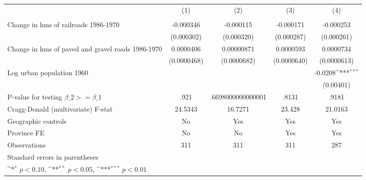 {
\def\sym#1{\ifmmode^{#1}\else\(^{#1}\)\fi}
\begin{tabular}{l*{4}{c}}
\hline\hline
                &\multicolumn{1}{c}{(1)}&\multicolumn{1}{c}{(2)}&\multicolumn{1}{c}{(3)}&\multicolumn{1}{c}{(4)}\\
                &\multicolumn{1}{c}{}&\multicolumn{1}{c}{}&\multicolumn{1}{c}{}&\multicolumn{1}{c}{}\\
\hline
Change in kms of railroads 1986-1970&-0.000346         &-0.000115         &-0.000171         &-0.000253         \\
                &(0.000302)         &(0.000320)         &(0.000287)         &(0.000261)         \\
[1em]
Change in kms of paved and gravel roads 1986-1970&0.0000406         &0.00000871         &0.0000593         &0.0000734         \\
                &(0.0000468)         &(0.0000682)         &(0.0000640)         &(0.0000613)         \\
[1em]
Log urban population 1960&                  &                  &                  &  -0.0208\sym{***}\\
                &                  &                  &                  &(0.00401)         \\
\hline
P-value for testing $\beta\_{2} >= \beta\_{1}$&     .921         &.6698000000000001         &    .8131         &    .9181         \\
Cragg-Donald (multivariate) F-stat&  24.5343         &  16.7271         &   23.428         &  21.0163         \\
Geographic controls&       No         &      Yes         &      Yes         &      Yes         \\
Province FE     &       No         &       No         &      Yes         &      Yes         \\
Observations    &      311         &      311         &      311         &      287         \\
\hline\hline
\multicolumn{5}{l}{\footnotesize Standard errors in parentheses}\\
\multicolumn{5}{l}{\footnotesize \sym{*} \(p<0.10\), \sym{**} \(p<0.05\), \sym{***} \(p<0.01\)}\\
\end{tabular}
}
